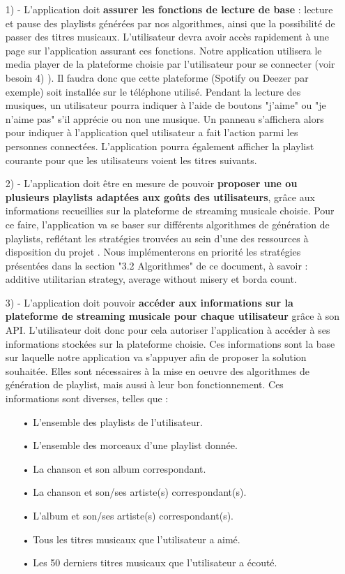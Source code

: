 \documentclass[12pt, openany]{report}
\begin{document}
\begin{itemize}
\item[1) -] L'application doit \textbf{assurer les fonctions de lecture de base} : lecture et pause des playlists générées par nos algorithmes, ainsi que la possibilité de passer des titres musicaux. L'utilisateur devra avoir accès rapidement à une page sur l'application assurant ces fonctions. Notre application utilisera le media player de la plateforme choisie par l'utilisateur pour se connecter (voir besoin 4) ). Il faudra donc que cette plateforme (Spotify ou Deezer par exemple) soit installée sur le téléphone utilisé. Pendant la lecture des musiques, un utilisateur pourra indiquer à l'aide de boutons "j'aime" ou "je n'aime pas" s'il apprécie ou non une musique. Un panneau s'affichera alors pour indiquer à l'application quel utilisateur a fait l'action parmi les personnes connectées. L'application pourra également afficher la playlist courante pour que les utilisateurs voient les titres suivants.
\\
\item[2) -] L'application doit être en mesure de pouvoir \textbf{proposer une ou plusieurs playlists adaptées aux goûts des utilisateurs}, grâce aux informations recueillies sur la plateforme de streaming musicale choisie. 
Pour ce faire, l'application va se baser sur différents algorithmes de génération de playlists, reflétant les stratégies trouvées au sein d'une des ressources à disposition du projet \cite{Algorithme}. Nous implémenterons en priorité les stratégies présentées dans la section "3.2 Algorithmes" de ce document, à savoir : additive utilitarian strategy, average without misery et borda count.
\\
\item[3) -] L'application doit pouvoir \textbf{accéder aux informations sur la plateforme de streaming musicale pour chaque utilisateur} grâce à son API. L'utilisateur doit donc pour cela autoriser l'application à accéder à ses informations stockées sur la plateforme choisie. Ces informations sont la base sur laquelle notre application va s'appuyer afin de proposer la solution souhaitée. Elles sont nécessaires à la mise en oeuvre des algorithmes de génération de playlist, mais aussi à leur bon fonctionnement. Ces informations sont diverses, telles que :
\begin{itemize}
\item[•] L'ensemble des playlists de l'utilisateur.
\item[•] L'ensemble des morceaux d'une playlist donnée.
\item[•] La chanson et son album correspondant.
\item[•] La chanson et son/ses artiste(s) correspondant(s).
\item[•] L'album et son/ses artiste(s) correspondant(s).
\item[•] Tous les titres musicaux que l'utilisateur a aimé.
\item[•] Les 50 derniers titres musicaux que l'utilisateur a écouté.


\end{itemize}
\end{itemize}
\end{document}
